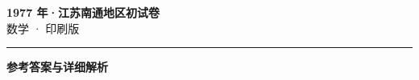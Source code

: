\documentclass[zihao=5, a4paper]{ctexart}
\begin{document}
\begin{center}
  {\Large\bfseries 1977 年·江苏南通地区初试卷}\\[4pt]
  {\large 数学 · 印刷版}
\end{center}
\medskip
{}

\par\bigskip\hrule\bigskip
{}
\begin{center}{\large\bfseries 参考答案与详细解析}\end{center}
\smallskip

\end{document}
